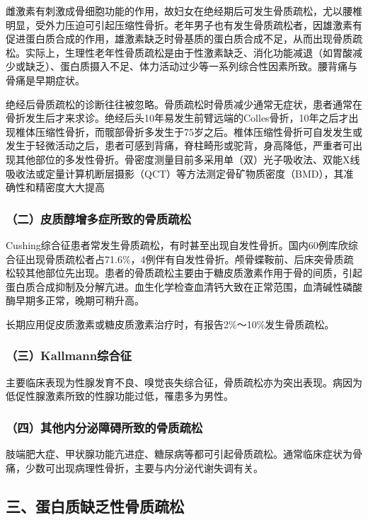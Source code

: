 雌激素有刺激成骨细胞功能的作用，故妇女在绝经期后可发生骨质疏松，尤以腰椎明显，受外力压迫可引起压缩性骨折。老年男子也有发生骨质疏松者，因雄激素有促进蛋白质合成的作用，雄激素缺乏时骨基质的蛋白质合成不足，从而出现骨质疏松。实际上，生理性老年性骨质疏松是由于性激素缺乏、消化功能减退（如胃酸减少或缺乏）、蛋白质摄入不足、体力活动过少等一系列综合性因素所致。腰背痛与骨痛是早期症状。

绝经后骨质疏松的诊断往往被忽略。骨质疏松时骨质减少通常无症状，患者通常在骨折发生后才来求诊。绝经后头10年易发生前臂远端的Colles骨折，10年之后才出现椎体压缩性骨折，而髋部骨折多发生于75岁之后。椎体压缩性骨折可自发发生或发生于轻微活动之后，患者可感到背痛，脊柱畸形或驼背，身高降低，严重者可出现其他部位的多发性骨折。骨密度测量目前多采用单（双）光子吸收法、双能X线吸收法或定量计算机断层摄影（QCT）等方法测定骨矿物质密度（BMD），其准确性和精密度大大提高

\subsubsection{（二）皮质醇增多症所致的骨质疏松}

Cushing综合征患者常发生骨质疏松，有时甚至出现自发性骨折。国内60例库欣综合征出现骨质疏松者占71.6\%，4例伴有自发性骨折。颅骨蝶鞍前、后床突骨质疏松较其他部位先出现。患者的骨质疏松主要由于糖皮质激素作用于骨的间质，引起蛋白质合成抑制及分解亢进。血生化学检查血清钙大致在正常范围，血清碱性磷酸酶早期多正常，晚期可稍升高。

长期应用促皮质激素或糖皮质激素治疗时，有报告2\%～10\%发生骨质疏松。

\subsubsection{（三）Kallmann综合征}

主要临床表现为性腺发育不良、嗅觉丧失综合征，骨质疏松亦为突出表现。病因为低促性腺激素所致的性腺功能过低，罹患多为男性。

\subsubsection{（四）其他内分泌障碍所致的骨质疏松}

肢端肥大症、甲状腺功能亢进症、糖尿病等都可引起骨质疏松。通常临床症状为骨痛，少数可出现病理性骨折，主要与内分泌代谢失调有关。

\subsection{三、蛋白质缺乏性骨质疏松}


